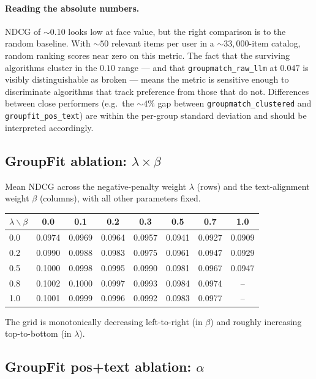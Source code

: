 \documentclass[11pt]{article}
\begin{document}
\paragraph{Reading the absolute numbers.}
NDCG of $\sim 0.10$ looks low at face value, but the right comparison
is to the random baseline. With $\sim 50$ relevant items per user in a
$\sim 33{,}000$-item catalog, random ranking scores near zero on this
metric. The fact that the surviving algorithms cluster in the
$0.10$ range --- and that \texttt{groupmatch\_raw\_llm} at $0.047$ is
visibly distinguishable as broken --- means the metric is sensitive
enough to discriminate algorithms that track preference from those
that do not. Differences between close performers (e.g.\ the $\sim 4\%$
gap between \texttt{groupmatch\_clustered} and \texttt{groupfit\_pos\_text})
are within the per-group standard deviation and should be interpreted
accordingly.

\subsection{GroupFit ablation: $\lambda \times \beta$}

Mean NDCG across the negative-penalty weight $\lambda$ (rows) and the
text-alignment weight $\beta$ (columns), with all other parameters
fixed.

\begin{center}
\begin{tabular}{lccccccc}
\toprule
$\lambda \backslash \beta$ & 0.0 & 0.1 & 0.2 & 0.3 & 0.5 & 0.7 & 1.0 \\
\midrule
0.0 & 0.0974 & 0.0969 & 0.0964 & 0.0957 & 0.0941 & 0.0927 & 0.0909 \\
0.2 & 0.0990 & 0.0988 & 0.0983 & 0.0975 & 0.0961 & 0.0947 & 0.0929 \\
0.5 & 0.1000 & 0.0998 & 0.0995 & 0.0990 & 0.0981 & 0.0967 & 0.0947 \\
0.8 & 0.1002 & 0.1000 & 0.0997 & 0.0993 & 0.0984 & 0.0974 & --     \\
1.0 & 0.1001 & 0.0999 & 0.0996 & 0.0992 & 0.0983 & 0.0977 & --     \\
\bottomrule
\end{tabular}
\end{center}

The grid is monotonically decreasing left-to-right (in $\beta$) and
roughly increasing top-to-bottom (in $\lambda$).

\subsection{GroupFit pos+text ablation: $\alpha$}
\end{document}
